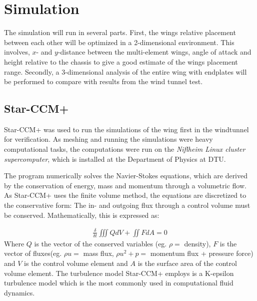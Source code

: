 \chapter{Simulation}
\label{chap:simulations}

  The simulation will run in several parts. First, the wings relative placement between each other will be optimized in a 2-dimensional environment. This involves, $x$- and $y$-distance between the multi-element wings, angle of attack and height relative to the chassis to give a good estimate of the wings placement range. Secondly, a 3-dimensional analysis of the entire wing with endplates will be performed to compare with results from the wind tunnel test. %

\section{Star-CCM+}
  Star-CCM+ was used to run the simulations of the wing first in the windtunnel for verification. As meshing and running the simulations were heavy computational tasks, the computations were run on the \emph{Niflheim Linux cluster supercomputer}, which is installed at the Department of Physics at DTU.

  The program numerically solves the Navier-Stokes equations, which are derived by the conservation of energy, mass and momentum through a volumetric flow. As Star-CCM+ uses the finite volume method, the equations are discretized to the conservative form: The in- and outgoing flux through a control volume must be conserved. Mathematically, this is expressed as:

  \begin{align}
    \frac{\delta}{\delta t} \iiint Q dV + \iint F dA = 0
  \end{align}
  Where $Q$ is the vector of the conserved variables (eg. $\rho =$ density), $F$ is the vector of fluxes(eg. $\rho u =$ mass flux, $\rho u^2 + p=$ momentum flux + pressure force) and $V$ is the control volume element and $A$ is the surface area of the control volume element. The turbulence model Star-CCM+ employs is a K-epsilon turbulence model which is the most commonly used in computational fluid dynamics. %


